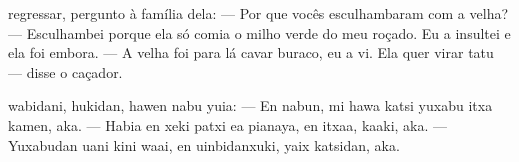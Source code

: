

 regressar, pergunto
à família dela:
--- Por que vocês
esculhambaram com a velha?
--- Esculhambei porque ela só
comia o milho verde do meu
roçado. Eu a insultei e
ela foi embora.
--- A velha foi para lá cavar
buraco, eu a vi. Ela quer virar
tatu — disse o caçador.

\vspace{2em}

 wabidani, hukidan,
hawen nabu yuia:
--- En nabun, mi hawa
katsi yuxabu
itxa kamen, aka.
--- Habia en xeki patxi
ea pianaya,
en itxaa, kaaki, aka.
--- Yuxabudan uani kini
waai, en uinbidanxuki,
yaix katsidan, aka.

\vspace*{\fill}

